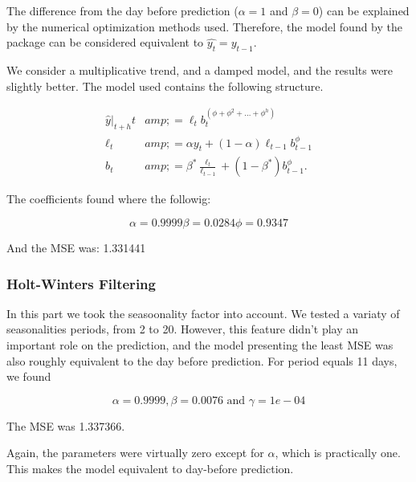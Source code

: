 The difference from the day before prediction ($\alpha =1$ and $\beta = 0$) can be explained by the 
numerical optimization methods used. Therefore, the model found by the package can be considered equivalent
to $\hat{y_t} = y_{t-1}$.

We consider a multiplicative trend, and a damped model, and the results were slightly better.
The model used contains the following structure.

\begin{align*} 
	\hat{y}|_{t+h}{t} &amp;=
	\ell_{t}b_{t}^{(\phi+\phi^2 + \dots + \phi^{h})} \\
	\ell_{t} &amp;= \alpha y_{t} + (1 - \alpha)\ell_{t-1}
	b^\phi_{t-1}\\ b_{t} &amp;= \beta^*\frac{\ell_{t}}{
	\ell_{t-1}} + (1 -\beta^*)b_{t-1}^{\phi}. 
\end{align*} 

The coefficients found where the followig:

$$
\alpha = 0.9999 
\beta  = 0.0284 
\phi   = 0.9347 
$$

And the MSE was: 1.331441


\subsubsection{Holt-Winters Filtering}

In this part we took the seasoonality factor into account.
We tested a variaty of seasonalities periods, from 2 to 20.
However, this feature didn't play an important role on the prediction, and the model presenting the least MSE 
was also roughly equivalent to the day before prediction. For period equals 11 days, we found 

$$
\alpha = 0.9999,
\beta  = 0.0076 \text{ and }
\gamma = 1e-04
$$
 
The MSE was 1.337366.

Again, the parameters were virtually zero except for $\alpha$, 
which is practically one. This makes the model equivalent to day-before prediction.






